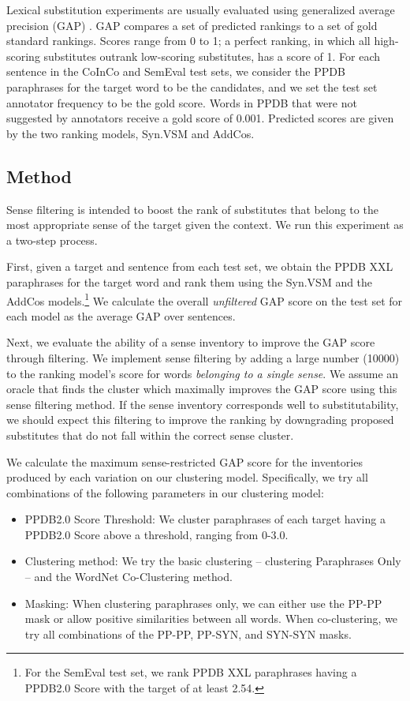 \documentclass[11pt]{article}
\begin{document}
Lexical substitution experiments are usually evaluated using generalized average precision (GAP) \cite{kishida2005property}. GAP compares a set of predicted rankings to a set of gold standard rankings. Scores range from 0 to 1; a perfect ranking, in which all high-scoring substitutes outrank low-scoring substitutes, has a score of 1. For each sentence in the CoInCo and SemEval test sets, we consider the PPDB paraphrases for the target word to be the candidates, and we set the test set annotator frequency to be the gold score. Words in PPDB that were not suggested by annotators receive a gold score of 0.001. Predicted scores are given by the two ranking models, Syn.VSM and AddCos.

\subsection{Method}

Sense filtering is intended to boost the rank of substitutes that belong to the most appropriate sense of the target given the context. We run this experiment as a two-step process.

First, given a target and sentence from each test set, we obtain the PPDB XXL paraphrases for the target word and rank them using the Syn.VSM and the AddCos models.\footnote{For the SemEval test set, we rank PPDB XXL paraphrases having a PPDB2.0 Score with the target of at least 2.54.} We calculate the overall \textit{unfiltered} GAP score on the test set for each model as the average GAP over sentences.

Next, we evaluate the ability of a sense inventory to improve the GAP score through filtering. We implement sense filtering by adding a large number (10000) to the ranking model's score for words \textit{belonging to a single sense}. We assume an oracle that finds the cluster which maximally improves the GAP score using this sense filtering method. If the sense inventory corresponds well to substitutability, we should expect this filtering to improve the ranking by downgrading proposed substitutes that do not fall within the correct sense cluster. 

We calculate the maximum sense-restricted GAP score for the inventories produced by each variation on our clustering model. Specifically, we try all combinations of the following parameters in our clustering model:

\begin{itemize}
	\item PPDB2.0 Score Threshold: We cluster paraphrases of each target having a PPDB2.0 Score above a threshold, ranging from 0-3.0.
	\item Clustering method: We try the basic clustering -- clustering Paraphrases Only -- and the WordNet Co-Clustering method.
	\item Masking: When clustering paraphrases only, we can either use the PP-PP mask or allow positive similarities between all words. When co-clustering, we try all combinations of the PP-PP, PP-SYN, and SYN-SYN masks.
\end{itemize}
\end{document}
